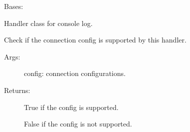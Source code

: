 \documentclass[letterpaper,10pt,english]{sphinxmanual}
\begin{document}
\begin{fulllineitems}

\begin{fulllineitems}
\label{\detokenize{QConnectBase:QConnectBase.qlogger.ColorFormatter.yellow}}\pysigline{\sphinxbfcode{\sphinxupquote{yellow}}\sphinxbfcode{\sphinxupquote{\DUrole{w}{  }\DUrole{p}{=}\DUrole{w}{  }\textquotesingle{}\textbackslash{}x1b{[}33;21m\textquotesingle{}}}}
\end{fulllineitems}


\end{fulllineitems}


\begin{fulllineitems}
\label{\detokenize{QConnectBase:QConnectBase.qlogger.QConsoleHandler}}
\sphinxAtStartPar
Bases: 

\sphinxAtStartPar
Handler class for console log.

\begin{fulllineitems}
\label{\detokenize{QConnectBase:QConnectBase.qlogger.QConsoleHandler.get_config_supported}}
\sphinxAtStartPar
Check if the connection config is supported by this handler.
\begin{description}
\item[{Args:}] \leavevmode
\sphinxAtStartPar
config: connection configurations.

\item[{Returns:}] \leavevmode
\sphinxAtStartPar
True if the config is supported.

\sphinxAtStartPar
False if the config is not supported.

\end{description}

\end{fulllineitems}


\end{fulllineitems}
\end{document}
